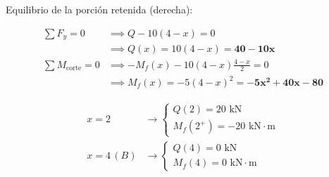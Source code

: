 \begin{center}
\begin{minipage}{0.48\textwidth}

    \end{minipage}\hfill

    \begin{minipage}{0.48\textwidth}

        Equilibrio de la porción retenida (derecha):

        \begin{align*}

            \sum F_y = 0              & \implies Q - 10(4-x) = 0                                \\

                                      & \implies Q(x) = 10(4-x) = \mathbf{40 - 10x}             \\[6pt]

            \sum M_{\text{corte}} = 0 & \implies -M_f(x) - 10(4-x)\frac{4-x}{2} = 0             \\

                                      & \implies M_f(x) = -5(4-x)^2 = \mathbf{-5x^2 + 40x - 80}

        \end{align*}

        \vspace{2pt}

        \begin{equation*}

            \begin{aligned}

                x = 2      & \to \begin{cases} Q(2) = 20\text{ kN} \\ M_f(2^+) = -20\text{ kN}\cdot\text{m} \end{cases} \\[4pt]

                x = 4\,(B) & \to \begin{cases} Q(4) = 0\text{ kN} \\ M_f(4) = 0\text{ kN}\cdot\text{m} \end{cases}

            \end{aligned}

        \end{equation*}

    \end{minipage}

\end{center}



